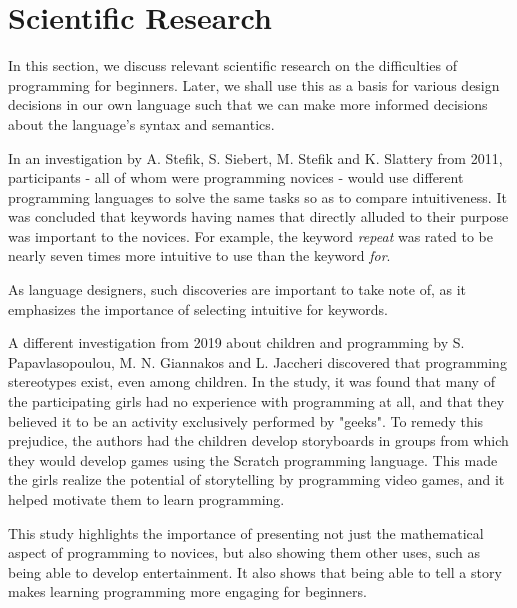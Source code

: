 \chapter{Scientific Research} \label{chap:analysis}
In this section, we discuss relevant scientific research on the difficulties of programming for beginners.
Later, we shall use this as a basis for various design decisions in our own language such that we can make more 
informed decisions about the language's syntax and semantics.

In an investigation by A. Stefik, S. Siebert, M. Stefik and K. Slattery from 2011, participants - all of whom were
programming novices - would use different programming languages to solve the same tasks so as to compare intuitiveness. 
It was concluded that keywords having names that directly alluded to their purpose was important to the novices. 
For example, the keyword \emph{repeat} was rated to be nearly seven times more intuitive to use than the keyword \emph{for}\cite{stefik_empirical_2011}.

As language designers, such discoveries are important to take note of, as it emphasizes the importance of selecting intuitive for keywords.

A different investigation from 2019 about children and programming by S. Papavlasopoulou, M. N. Giannakos and L. Jaccheri discovered that 
programming stereotypes exist, even among children. 
In the study, it was found that many of the participating girls had no experience with programming at all, and that they believed it 
to be an activity exclusively performed by "geeks". 
To remedy this prejudice, the authors had the children develop storyboards in groups from which they would develop games using the 
Scratch programming language. 
This made the girls realize the potential of storytelling by programming video games, and it helped motivate them to learn programming\cite{papavlasopoulou_exploring_2019}.

This study highlights the importance of presenting not just the mathematical aspect of programming to novices, but also 
showing them other uses, such as being able to develop entertainment. 
It also shows that being able to tell a story makes learning programming more engaging for beginners.

